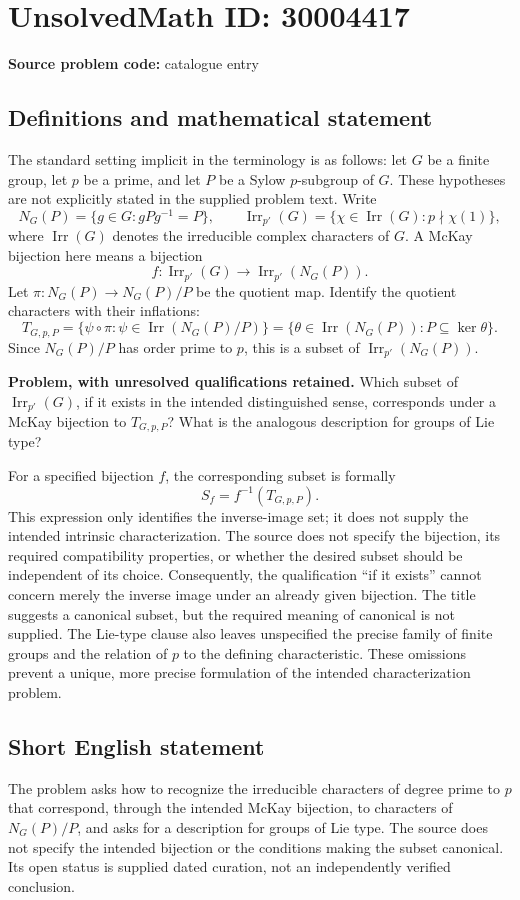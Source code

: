 \documentclass[11pt]{article}
\begin{document}
\section*{UnsolvedMath ID: 30004417}
\textbf{Source problem code:} catalogue entry
\subsection{Definitions and mathematical statement}
The standard setting implicit in the terminology is as follows: let \(G\) be a finite group, let \(p\) be a prime, and let \(P\) be a Sylow \(p\)-subgroup of \(G\). These hypotheses are not explicitly stated in the supplied problem text. Write
\[
N_G(P)=\{g\in G:gPg^{-1}=P\},\qquad
\operatorname{Irr}_{p'}(G)=\{\chi\in\operatorname{Irr}(G):p\nmid\chi(1)\},
\]
where \(\operatorname{Irr}(G)\) denotes the irreducible complex characters of \(G\). A McKay bijection here means a bijection
\[
f:\operatorname{Irr}_{p'}(G)\longrightarrow\operatorname{Irr}_{p'}(N_G(P)).
\]
Let \(\pi:N_G(P)\to N_G(P)/P\) be the quotient map. Identify the quotient characters with their inflations:
\[
T_{G,p,P}=\{\psi\circ\pi:\psi\in\operatorname{Irr}(N_G(P)/P)\}
=\{\theta\in\operatorname{Irr}(N_G(P)):P\subseteq\ker\theta\}.
\]
Since \(N_G(P)/P\) has order prime to \(p\), this is a subset of \(\operatorname{Irr}_{p'}(N_G(P))\).

\textbf{Problem, with unresolved qualifications retained.} Which subset of \(\operatorname{Irr}_{p'}(G)\), if it exists in the intended distinguished sense, corresponds under a McKay bijection to \(T_{G,p,P}\)? What is the analogous description for groups of Lie type?

For a specified bijection \(f\), the corresponding subset is formally
\[
S_f=f^{-1}(T_{G,p,P}).
\]
This expression only identifies the inverse-image set; it does not supply the intended intrinsic characterization. The source does not specify the bijection, its required compatibility properties, or whether the desired subset should be independent of its choice. Consequently, the qualification ``if it exists'' cannot concern merely the inverse image under an already given bijection. The title suggests a canonical subset, but the required meaning of canonical is not supplied. The Lie-type clause also leaves unspecified the precise family of finite groups and the relation of \(p\) to the defining characteristic. These omissions prevent a unique, more precise formulation of the intended characterization problem.
\subsection{Short English statement}
The problem asks how to recognize the irreducible characters of degree prime to \(p\) that correspond, through the intended McKay bijection, to characters of \(N_G(P)/P\), and asks for a description for groups of Lie type. The source does not specify the intended bijection or the conditions making the subset canonical. Its open status is supplied dated curation, not an independently verified conclusion.
\end{document}
